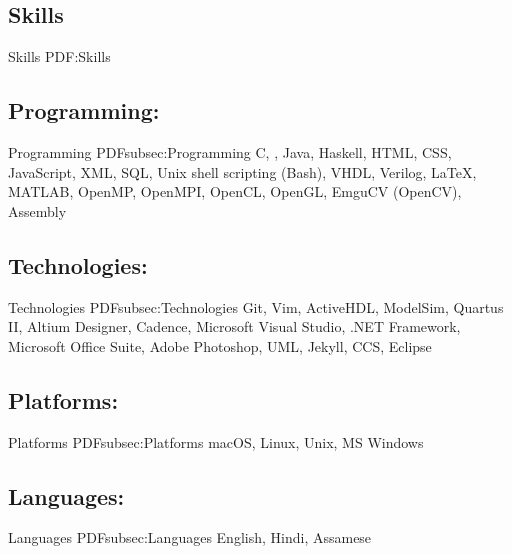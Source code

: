 \documentclass[a4paper,10pt,oneside]{article}
\begin{document}
\begin{body}



\section
{Skills}
{Skills}
{PDF:Skills}
\subsection
{Programming:}
{Programming}
{PDFsubsec:Programming}
C, \Csharp, Java, Haskell, HTML, CSS, JavaScript, XML, SQL, Unix shell scripting (Bash), VHDL, Verilog, {\LaTeX}, MATLAB, OpenMP, OpenMPI, OpenCL, OpenGL, EmguCV (OpenCV), Assembly
\vspace{15pt}
\subsection
{Technologies:}
{Technologies}
{PDFsubsec:Technologies}
Git, Vim, ActiveHDL, ModelSim, Quartus II, Altium Designer, Cadence, Microsoft Visual Studio, .NET Framework, Microsoft Office Suite, Adobe Photoshop, UML, Jekyll, CCS, Eclipse
\vspace{15pt}
\subsection
{Platforms:}
{Platforms}
{PDFsubsec:Platforms}
macOS, Linux, Unix, MS Windows
\vspace{15pt}
\subsection
{Languages:}
{Languages}
{PDFsubsec:Languages}
English, Hindi, Assamese

\vspace{-5pt}
\hline


\end{body}
\end{document}
